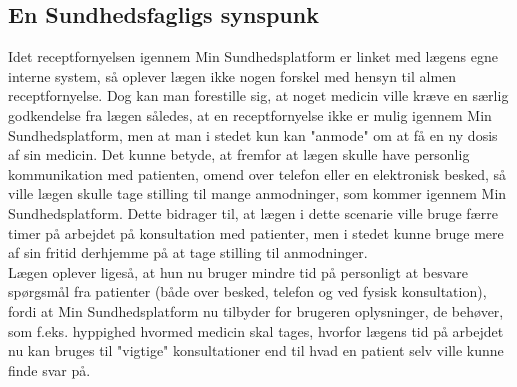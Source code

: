 \subsection{En Sundhedsfagligs synspunk}
Idet receptfornyelsen igennem Min Sundhedsplatform er linket med lægens egne interne system, så oplever lægen ikke nogen forskel med hensyn til almen receptfornyelse. Dog kan man forestille sig, at noget medicin ville kræve en særlig godkendelse fra lægen således, at en receptfornyelse ikke er mulig igennem Min Sundhedsplatform, men at man i stedet kun kan "anmode" om at få en ny dosis af sin medicin. Det kunne betyde, at fremfor at lægen skulle have personlig kommunikation med patienten, omend over telefon eller en elektronisk besked, så ville lægen skulle  tage stilling til mange anmodninger, som kommer igennem Min Sundhedsplatform. Dette bidrager til, at lægen i dette scenarie ville bruge færre timer på arbejdet på konsultation med patienter, men i stedet kunne bruge mere af sin fritid derhjemme på at tage stilling til anmodninger. \\
Lægen oplever ligeså, at hun nu bruger mindre tid på personligt at besvare spørgsmål fra patienter (både over besked, telefon og ved fysisk konsultation), fordi at Min Sundhedsplatform nu tilbyder for brugeren oplysninger, de behøver, som f.eks. hyppighed hvormed medicin skal tages, hvorfor lægens tid på arbejdet nu kan bruges til "vigtige" konsultationer end til hvad en patient selv ville kunne finde svar på. 
